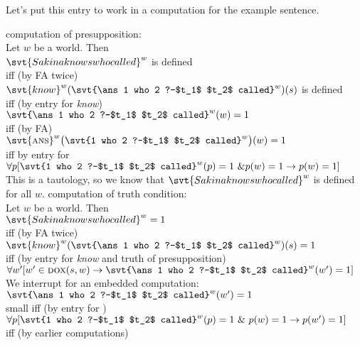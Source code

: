 Let's put this entry to work in a computation for the example sentence.

\pex\label{ex:knows-who-comp}%
\a computation of presupposition:\\
Let $w$ be a world. Then \\
$\svt{Sakina knows who called}^{w}$ is defined\\
%
{\small iff (by FA twice)}\\
$\svt{know}^{w}(\svt{\ans 1 who 2 ?-$t_1$ $t_2$ called}^{w})(s)$ is defined\\
{\small iff (by entry for \emph{know})}\\
$\svt{\ans 1 who 2 ?-$t_1$ $t_2$ called}^{w}(w)=1$\\
{\small iff (by FA)}\\
$\svt{\ans}^{w}\big(\svt{1 who 2 ?-$t_1$ $t_2$ called}^{w}\bigr)(w)=1$\\
{\small iff by entry for \ans}\\
$\forall p [ \svt{1 who 2 ?-$t_1$ $t_2$ called}^{w}(p)=1\ \& p(w)=1 \rightarrow p(w)=1 ]$\\
This is a tautology, so we know that $\svt{Sakina knows who called}^{w}$ is
defined for all $w$.
\a computation of truth condition:\\
Let $w$ be a world. Then\\
$\svt{Sakina knows who called}^{w} = 1$\\
{\small iff (by FA twice)}\\
$\svt{know}^{w}(\svt{\ans 1 who 2 ?-$t_1$ $t_2$ called}^{w})(s) = 1$\\
{\small iff (by entry for \emph{know} and truth of presupposition)}\\
$\forall w' [w'\in \dox(s,w) \rightarrow \svt{\ans 1 who 2 ?-$t_1$ $t_2$ called}^{w}(w')=1]$
\a We interrupt for an embedded computation:\\
$\svt{\ans 1 who 2 ?-$t_1$ $t_2$ called}^{w}(w')=1$\\
{small iff (by entry for \ans)}\\
$\forall p [ \svt{1 who 2 ?-$t_1$ $t_2$ called}^{w}(p)=1\ \&\ p(w)=1 \rightarrow p(w')=1 ]$\\
{\small iff (by earlier computations)}\\
